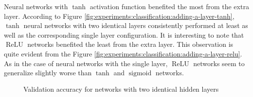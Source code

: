 Neural networks with $\operatorname{tanh}$ activation function benefited the most from the extra layer. According to Figure \ref{fig:experiments:classification:adding-a-layer-tanh}, $\operatorname{tanh}$ neural networks with two identical layers consistently performed at least as well as the corresponding single layer configuration. It is interesting to note that $\operatorname{ReLU}$ networks benefited the least from the extra layer. This observation is quite evident from the Figure \ref{fig:experiments:classification:adding-a-layer-relu}. As in the case of neural networks with the single layer, $\operatorname{ReLU}$ networks seem to generalize slightly worse than $\operatorname{tanh}$ and $\operatorname{sigmoid}$ networks.

\begin{figure}[H]
    \centering
    \caption{Validation accuracy for networks with two identical hidden layers}
    \label{fig:experiments:classification:adding-a-layer-all-activations}
\end{figure}
\newpage
